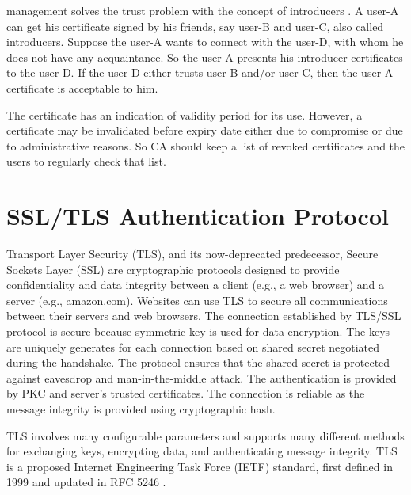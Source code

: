 \begin{multicols}{2}
\noindent
  management solves the trust problem with the concept of introducers \cite{chap2-key1}. A user-A can get his certificate signed by his friends, say user-B and user-C, also called introducers. Suppose the user-A wants to connect with the user-D, with whom he does not have any acquaintance. So the user-A presents his introducer certificates to the user-D. If the user-D either trusts user-B and/or user-C, then the user-A certificate is acceptable to him.

The certificate has an indication of validity period for its use. However, a certificate may be invalidated before expiry date either due to compromise or due to administrative reasons. So CA should keep a list of revoked certificates and the users to regularly check that list.

\section*{SSL/TLS Authentication Protocol}

Transport Layer Security (TLS), and its now-deprecated predecessor, Secure Sockets Layer (SSL) are cryptographic protocols designed to provide confidentiality and data integrity between a client (e.g., a web browser) and a server (e.g., amazon.com). Websites can use TLS to secure all communications between their servers and web browsers. The connection established by TLS/SSL protocol is secure because symmetric key is used for data encryption. The keys are uniquely generates for each connection based on shared secret negotiated during the handshake. The protocol ensures that the shared secret is protected against eavesdrop and man-in-the-middle attack. The authentication is provided by PKC and server's trusted certificates. The connection is reliable as the message integrity is provided using cryptographic hash.

TLS involves many configurable parameters and supports many different methods for exchanging keys, encrypting data, and authenticating message integrity. TLS is a proposed Internet Engineering Task Force (IETF) standard, first defined in 1999 and updated in RFC 5246 \cite{chap2-key16}.


\end{multicols}
